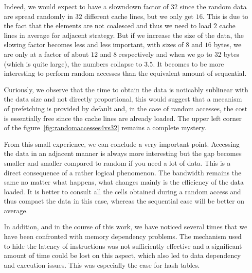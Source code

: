 Indeed, we would expect to have a slowndown factor of $32$ since the random data are spread randomly in $32$ different cache lines, but we only get $16$. This is due to the fact that the elements are not coalesced and thus we need to load $2$ cache lines in average for adjacent strategy. But if we increase the size of the data, the slowing factor becomes less and less important, with sizes of $8$ and $16$ bytes, we are only at a factor of about $12$ and $8$ respectively and when we go to $32$ bytes (which is quite large), the numbers collapse to $3.5$. It becomes to be more interesting to perform random accesses than the equivalent amount of sequential.

Curiously, we observe that the time to obtain the data is noticably sublinear with the data size and not directly proportional, this would suggest that a mecanism of prefetching is provided by default and, in the case of random accesses, the cost is essentially free since the cache lines are already loaded. The upper left corner of the figure~\ref{fig:randomaccesses4vs32} remains a complete mystery.

From this small experience, we can conclude a very important point. Accessing the data in an adjacent manner is always more interesting but the gap becomes smaller and smaller compared to random if you need a lot of data. This is a direct consequence of a rather logical phenomenon. The bandwidth remains the same no matter what happens, what changes mainly is the efficiency of the data loaded. It is better to consult all the cells obtained during a random access and thus compact the data in this case, whereas the sequential case will be better on average.

In addition, and in the course of this work, we have noticed several times that we have been confronted with memory dependency problems. The mechanism used to hide the latency of instructions was not sufficiently effective and a significant amount of time could be lost on this aspect, which also led to data dependency and execution issues. This was especially the case for hash tables.
